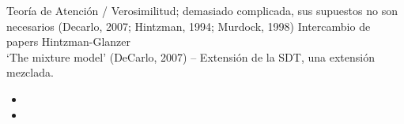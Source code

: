 Teoría de Atención / Verosimilitud; demasiado complicada, sus supuestos no son necesarios (Decarlo, 2007; Hintzman, 1994; Murdock, 1998) Intercambio de papers Hintzman-Glanzer\\
‘The mixture model’ (DeCarlo, 2007) – Extensión de la SDT, una extensión mezclada.\\

\begin{itemize} 
\item
\item
\end{itemize}


